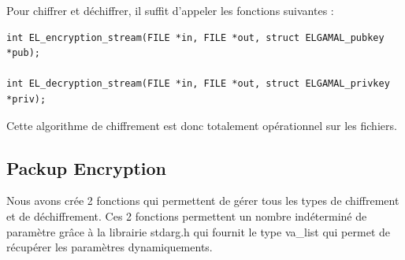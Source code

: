 		Pour chiffrer et déchiffrer, il suffit d'appeler les fonctions suivantes :
		
		\begin{lstlisting}[style=CStyle]
int EL_encryption_stream(FILE *in, FILE *out, struct ELGAMAL_pubkey *pub);

int EL_decryption_stream(FILE *in, FILE *out, struct ELGAMAL_privkey *priv);
		\end{lstlisting}
		
		Cette algorithme de chiffrement est donc totalement opérationnel sur les fichiers.
		
	\newpage	
	
	\subsection{Packup Encryption}
	
	Nous avons crée 2 fonctions qui permettent de gérer tous les types de chiffrement et de déchiffrement.
	Ces 2 fonctions permettent un nombre indéterminé de paramètre grâce à la librairie stdarg.h qui fournit le type va\_list qui permet de récupérer les paramètres dynamiquements. \\

